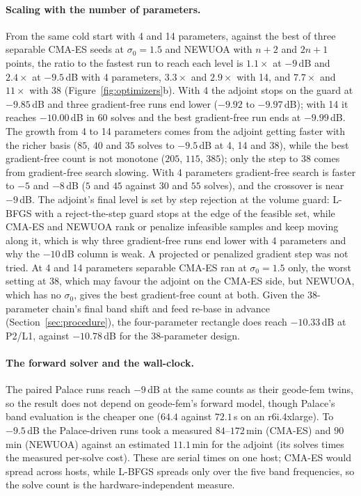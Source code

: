 \documentclass{anvil-paper}
\newcommand{\PL}{P2/L1}
\begin{document}
\paragraph{Scaling with the number of parameters.}
From the same cold start with 4 and 14 parameters, against the best of three
separable CMA-ES seeds at $\sigma_0 = 1.5$ and NEWUOA with $n + 2$ and
$2n + 1$ points, the ratio to the fastest run to reach each level is
$1.1\times$ at $-9$\,dB and $2.4\times$ at $-9.5$\,dB with 4 parameters,
$3.3\times$ and $2.9\times$ with 14, and $7.7\times$ and $11\times$ with 38 (Figure~\ref{fig:optimizers}b). With 4 the adjoint stops on the guard
at $-9.85$\,dB and three gradient-free runs end lower ($-9.92$ to
$-9.97$\,dB); with 14 it reaches $-10.00$\,dB in $60$ solves and the best
gradient-free run ends at $-9.99$\,dB. The growth from 4 to 14 parameters
comes from the adjoint getting faster with the richer basis ($85$, $40$ and
$35$ solves to $-9.5$\,dB at 4, 14 and 38), while the best gradient-free
count is not monotone ($205$, $115$, $385$); only the step to 38 comes from
gradient-free search slowing. With 4 parameters gradient-free search is
faster to $-5$ and $-8$\,dB ($5$ and $45$ against $30$ and $55$ solves), and
the crossover is near $-9$\,dB. The adjoint's final level is set by step
rejection at the volume guard: L-BFGS with a reject-the-step guard stops at
the edge of the feasible set, while CMA-ES and NEWUOA rank or penalize
infeasible samples and keep moving along it, which is why three
gradient-free runs end lower with 4 parameters and why the $-10$\,dB column
is weak. A projected or penalized gradient step was not tried. At 4 and 14 parameters separable
CMA-ES ran at $\sigma_0 = 1.5$ only, the worst setting at 38, which may
favour the adjoint on the CMA-ES side, but NEWUOA, which has no $\sigma_0$,
gives the best gradient-free count at both. Given the 38-parameter chain's final band
shift and feed re-base in advance (Section~\ref{sec:procedure}), the
four-parameter rectangle does reach $-10.33$\,dB at \PL{}, against
$-10.78$\,dB for the 38-parameter design.

\paragraph{The forward solver and the wall-clock.}
The paired Palace runs reach $-9$\,dB at the same counts as their geode-fem
twins, so the result does not depend on geode-fem's forward model, though
Palace's band evaluation is the cheaper one ($64.4$ against $72.1$\,s on an
r6i.4xlarge). To $-9.5$\,dB the Palace-driven runs took a measured
$84$--$172$\,min (CMA-ES) and $90$\,min (NEWUOA) against an estimated
$11.1$\,min for the adjoint (its solves times the measured per-solve cost). These
are serial times on one host; CMA-ES would spread across hosts, while L-BFGS
spreads only over the five band frequencies, so the solve count is the
hardware-independent measure.
\end{document}

